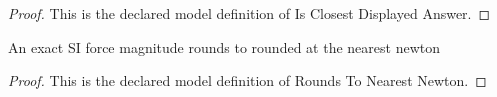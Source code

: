 \begin{proof}
  This is the declared model definition of Is Closest Displayed Answer.
\end{proof}
\begin{definition}
  \label{def:physics:phyx-mini-0756:phyxminiproblems-problemphyxmini0756-roundstonearestnewton}
  An exact SI force magnitude rounds to rounded at the nearest newton
\end{definition}
\begin{proof}
  This is the declared model definition of Rounds To Nearest Newton.
\end{proof}
